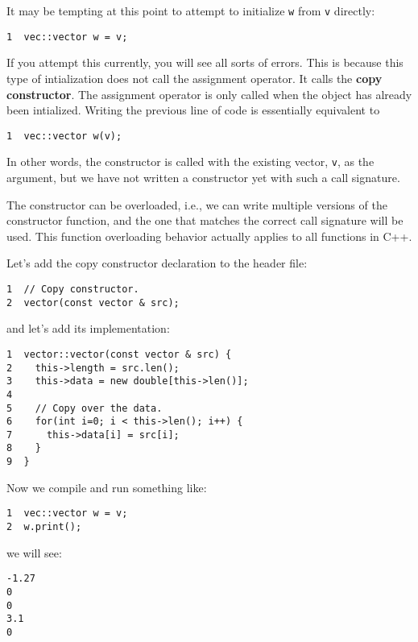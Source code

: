 \documentclass[11pt]{article}
\begin{document}
It may be tempting at this point to attempt to initialize \texttt{w} from \texttt{v}
directly:

\begin{verbatim}
1  vec::vector w = v;
\end{verbatim}

If you attempt this currently, you will see all sorts of errors. This is 
because this type of intialization does not call the assignment operator. 
It calls the \textbf{copy constructor}. The assignment operator is only called 
when the object has already been intialized. Writing the previous line of 
code is essentially equivalent to

\begin{verbatim}
1  vec::vector w(v);
\end{verbatim}

In other words, the constructor is called with the existing vector, \texttt{v}, as
the argument, but we have not written a constructor yet with such a call 
signature.

The constructor can be overloaded, i.e., we can write multiple versions of the 
constructor function, and the one that matches the correct call signature will 
be used. This function overloading behavior actually applies to all functions 
in C++.

Let's add the copy constructor declaration to the header file:

\begin{verbatim}
1  // Copy constructor.
2  vector(const vector & src);
\end{verbatim}

and let's add its implementation:

\begin{verbatim}
1  vector::vector(const vector & src) {
2    this->length = src.len();
3    this->data = new double[this->len()];
4  
5    // Copy over the data.
6    for(int i=0; i < this->len(); i++) {
7      this->data[i] = src[i];
8    }
9  }
\end{verbatim}

Now we compile and run something like:

\begin{verbatim}
1  vec::vector w = v;
2  w.print();
\end{verbatim}

we will see:

\begin{verbatim}
-1.27
0
0
3.1
0
\end{verbatim}
\end{document}
